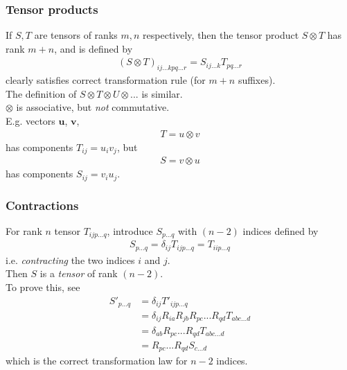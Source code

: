 \documentclass[a4paper]{article}
\begin{document}
\subsubsection{Tensor products}
If $S,T$ are tensors of ranks $m,n$ respectively, then the tensor product $S\otimes T$ has rank $m+n$, and is defined by
\begin{equation*}
\begin{aligned}
\left(S\otimes T\right)_{ij...k pq...r} = S_{ij...k} T_{pq...r}
\end{aligned}
\end{equation*}
clearly satisfies correct transformation rule (for $m+n$ suffixes).\\
The definition of $S\otimes T\otimes U\otimes...$ is similar.\\
$\otimes$ is associative, but \emph{not} commutative.\\
E.g. vectors $\mathbf{u}$, $\mathbf{v}$,
\begin{equation*}
\begin{aligned}
T=u\otimes v
\end{aligned}
\end{equation*}
has components $T_{ij} = u_i v_j$, but
\begin{equation*}
\begin{aligned}
S=v\otimes u
\end{aligned}
\end{equation*}
has components $S_{ij} = v_i u_j$.\\

\subsubsection{Contractions}
For rank $n$ tensor $T_{ijp...q}$, introduce $S_{p...q}$ with $\left(n-2\right)$ indices defined by
\begin{equation*}
\begin{aligned}
S_{p...q} = \delta_{ij} T_{ijp...q} = T_{iip...q}
\end{aligned}
\end{equation*}
i.e. \emph{contracting} the two indices $i$ and $j$.\\
Then $S$ is a \emph{tensor} of rank $\left(n-2\right)$.\\
To prove this, see
\begin{equation*}
\begin{aligned}
S'_{p...q} &= \delta_{ij} T'_{ijp...q}\\
&= \delta_{ij} R_{ia} R_{jb} R_{pc} ... R_{qd} T_{abc...d}\\
&= \delta_{ab} R_{pc} ... R_{qd} T_{abc...d}\\
&= R_{pc} ... R_{qd} S_{c...d}
\end{aligned}
\end{equation*}
which is the correct transformation law for $n-2$ indices.\\
\end{document}
